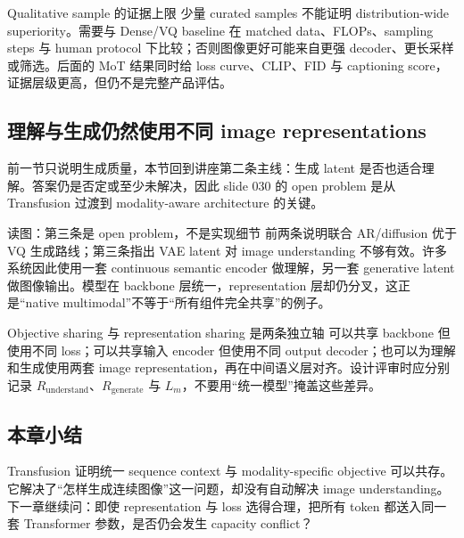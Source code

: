 \begin{warningbox}{Qualitative sample 的证据上限}
少量 curated samples 不能证明 distribution-wide superiority。需要与 Dense/VQ baseline 在 matched data、FLOPs、sampling steps 与 human protocol 下比较；否则图像更好可能来自更强 decoder、更长采样或筛选。后面的 MoT 结果同时给 loss curve、CLIP、FID 与 captioning score，证据层级更高，但仍不是完整产品评估。
\end{warningbox}

\subsection{理解与生成仍然使用不同 image representations}

前一节只说明生成质量，本节回到讲座第二条主线：生成 latent 是否也适合理解。答案仍是否定或至少未解决，因此 slide 030 的 open problem 是从 Transfusion 过渡到 modality-aware architecture 的关键。


\begin{knowledgebox}{读图：第三条是 open problem，不是实现细节}
前两条说明联合 AR/diffusion 优于 VQ 生成路线；第三条指出 VAE latent 对 image understanding 不够有效。许多系统因此使用一套 continuous semantic encoder 做理解，另一套 generative latent 做图像输出。模型在 backbone 层统一，representation 层却仍分叉，这正是“native multimodal”不等于“所有组件完全共享”的例子。
\end{knowledgebox}

\begin{importantbox}{Objective sharing 与 representation sharing 是两条独立轴}
可以共享 backbone 但使用不同 loss；可以共享输入 encoder 但使用不同 output decoder；也可以为理解和生成使用两套 image representation，再在中间语义层对齐。设计评审时应分别记录 $R_{\text{understand}}$、$R_{\text{generate}}$ 与 $L_m$，不要用“统一模型”掩盖这些差异。
\end{importantbox}

\subsection{本章小结}

Transfusion 证明统一 sequence context 与 modality-specific objective 可以共存。它解决了“怎样生成连续图像”这一问题，却没有自动解决 image understanding。下一章继续问：即使 representation 与 loss 选得合理，把所有 token 都送入同一套 Transformer 参数，是否仍会发生 capacity conflict？


